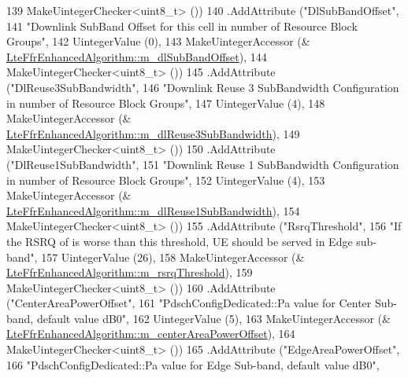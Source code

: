 \begin{DoxyCode}
139                    MakeUintegerChecker<uint8\_t> ())
140     .AddAttribute (\textcolor{stringliteral}{"DlSubBandOffset"},
141                    \textcolor{stringliteral}{"Downlink SubBand Offset for this cell in number of Resource Block Groups"},
142                    UintegerValue (0),
143                    MakeUintegerAccessor (&
      \hyperlink{classns3_1_1LteFfrEnhancedAlgorithm_a4bef25161f73b33a50e4caead81be03c}{LteFfrEnhancedAlgorithm::m\_dlSubBandOffset}),
144                    MakeUintegerChecker<uint8\_t> ())
145     .AddAttribute (\textcolor{stringliteral}{"DlReuse3SubBandwidth"},
146                    \textcolor{stringliteral}{"Downlink Reuse 3 SubBandwidth Configuration in number of Resource Block Groups"},
147                    UintegerValue (4),
148                    MakeUintegerAccessor (&
      \hyperlink{classns3_1_1LteFfrEnhancedAlgorithm_af53f7ff28e091ad65b5ccf2e04c9da98}{LteFfrEnhancedAlgorithm::m\_dlReuse3SubBandwidth}),
149                    MakeUintegerChecker<uint8\_t> ())
150     .AddAttribute (\textcolor{stringliteral}{"DlReuse1SubBandwidth"},
151                    \textcolor{stringliteral}{"Downlink Reuse 1 SubBandwidth Configuration in number of Resource Block Groups"},
152                    UintegerValue (4),
153                    MakeUintegerAccessor (&
      \hyperlink{classns3_1_1LteFfrEnhancedAlgorithm_a94ed6d631c21c643996662c9da64f294}{LteFfrEnhancedAlgorithm::m\_dlReuse1SubBandwidth}),
154                    MakeUintegerChecker<uint8\_t> ())
155     .AddAttribute (\textcolor{stringliteral}{"RsrqThreshold"},
156                    \textcolor{stringliteral}{"If the RSRQ of is worse than this threshold, UE should be served in Edge sub-band"},
157                    UintegerValue (26),
158                    MakeUintegerAccessor (&
      \hyperlink{classns3_1_1LteFfrEnhancedAlgorithm_abc46da1b7fd36b05250bd7b6e10c814e}{LteFfrEnhancedAlgorithm::m\_rsrqThreshold}),
159                    MakeUintegerChecker<uint8\_t> ())
160     .AddAttribute (\textcolor{stringliteral}{"CenterAreaPowerOffset"},
161                    \textcolor{stringliteral}{"PdschConfigDedicated::Pa value for Center Sub-band, default value dB0"},
162                    UintegerValue (5),
163                    MakeUintegerAccessor (&
      \hyperlink{classns3_1_1LteFfrEnhancedAlgorithm_a645576354030ccca6a9f7942110f73e9}{LteFfrEnhancedAlgorithm::m\_centerAreaPowerOffset}),
164                    MakeUintegerChecker<uint8\_t> ())
165     .AddAttribute (\textcolor{stringliteral}{"EdgeAreaPowerOffset"},
166                    \textcolor{stringliteral}{"PdschConfigDedicated::Pa value for Edge Sub-band, default value dB0"},

\end{DoxyCode}
